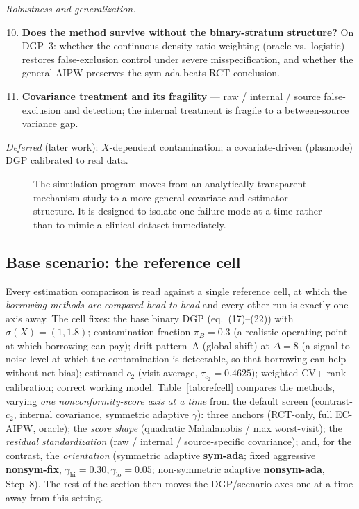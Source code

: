 \documentclass[11pt]{article}
\newcommand{\fullfig}[1]{\resizebox{\linewidth}{!}{}}
\begin{document}
\emph{Robustness and generalization.}
\begin{enumerate}\setcounter{enumi}{9}
    \item \textbf{Does the method survive without the binary-stratum structure?} On DGP~3: whether the continuous density-ratio weighting (oracle vs.\ logistic) restores false-exclusion control under severe misspecification, and whether the general AIPW preserves the sym-ada-beats-RCT conclusion.
    \item \textbf{Covariance treatment and its fragility} --- raw / internal / source false-exclusion and detection; the internal treatment is fragile to a between-source variance gap.
\end{enumerate}

\emph{Deferred} (later work): $X$-dependent contamination; a covariate-driven (plasmode) DGP calibrated to real data.

\begin{figure}[!ht]
\centering
\fullfig{simulation_map.tex}
\caption{The simulation program moves from an analytically transparent mechanism study to a more general covariate and estimator structure. It is designed to isolate one failure mode at a time rather than to mimic a clinical dataset immediately.}
\label{fig:simulation-map}
\end{figure}

\subsection{Base scenario: the reference cell}\label{sec:basecell}

Every estimation comparison is read against a single reference cell, at which the \emph{borrowing methods are compared head-to-head} and every other run is exactly one axis away. The cell fixes: the base binary DGP (eq.~(17)--(22)) with $\sigma(X){=}(1,1.8)$; contamination fraction $\pi_B{=}0.3$ (a realistic operating point at which borrowing can pay); drift pattern~A (global shift) at $\Delta{=}8$ (a signal-to-noise level at which the contamination is detectable, so that borrowing can help without net bias); estimand $c_2$ (visit average, $\tau_{c_2}{=}0.4625$); weighted CV+ rank calibration; correct working model. Table~\ref{tab:refcell} compares the methods, varying \emph{one nonconformity-score axis at a time} from the default screen (contrast-$c_2$, internal covariance, symmetric adaptive $\gamma$): three anchors (RCT-only, full EC-AIPW, oracle); the \emph{score shape} (quadratic Mahalanobis / max worst-visit); the \emph{residual standardization} (raw / internal / source-specific covariance); and, for the contrast, the \emph{orientation} (symmetric adaptive \textbf{sym-ada}; fixed aggressive \textbf{nonsym-fix}, $\gamma_{\mathrm{hi}}{=}0.30,\gamma_{\mathrm{lo}}{=}0.05$; non-symmetric adaptive \textbf{nonsym-ada}, Step~8). The rest of the section then moves the DGP/scenario axes one at a time away from this setting.
\end{document}
